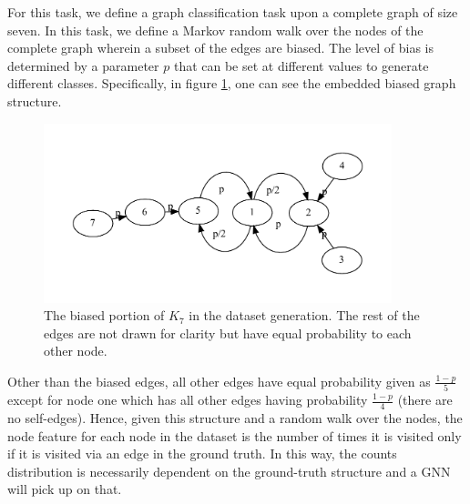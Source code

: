 For this task, we define a graph classification task upon a complete graph of size seven. In this task, we define a Markov random walk over the nodes of the complete graph wherein a subset of the edges are biased. The level of bias is determined by a parameter $p$ that can be set at different values to generate different classes. Specifically, in figure \ref{fig:graph-bias-model}, one can see the embedded biased graph structure.
\begin{figure}[h]
	\centering
	\includegraphics[width=0.9\textwidth]{images/tree-model.pdf}
	\caption{The biased portion of $K_7$ in the dataset generation. The rest of the edges are not drawn for clarity but have equal probability to each other node.}
	\label{fig:graph-bias-model}
\end{figure}
Other than the biased edges, all other edges have equal probability given as $\frac{1 - p}{5}$ except for node one which has all other edges having probability $\frac{1 - p}{4}$ (there are no self-edges). Hence, given this structure and a random walk over the nodes, the node feature for each node in the dataset is the number of times it is visited only if it is visited via an edge in the ground truth. In this way, the counts distribution is necessarily dependent on the ground-truth structure and a GNN will pick up on that.

